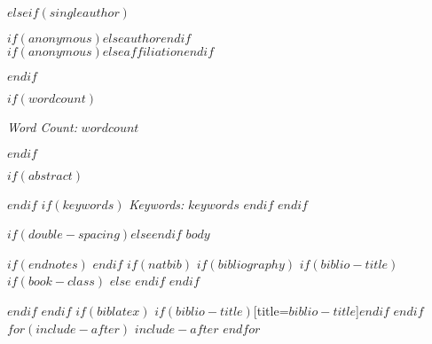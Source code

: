 \documentclass[twoside, $if(fontsize)$$fontsize$,$endif$$if(papersize)$$papersize$,$endif$$for(classoption)$$classoption$$sep$,$endfor$]{article}
\newcommand{\orcid}[1]{\href{https://orcid.org/#1}{\textcolor[HTML]{A6CE39}{\aiOrcid}}}
\newcommand{\gitrepo}[1]{\href{https://github.com/#1}{\textcolor[HTML]{000000}{\faGithub}}}
\begin{document}
	$elseif(singleauthor)$
	\begin{flushleft}
		\vspace*{6pt}
		\fontsize{26pt}{26pt}\selectfont\textit{$if(anonymous)$$else$$author$$endif$}
		\fontsize{18pt}{18pt}\selectfont\orcid{$orcid$} \gitrepo{$github$} \\
		\vspace*{12pt}                                                                                  
		\fontsize{18pt}{18pt}\selectfont \textbf{$if(anonymous)$$else$$affiliation$$endif$}
	\end{flushleft}
	$endif$
	
	$if(wordcount)$
	\begin{center}
		\textit{Word Count:} $wordcount$
	\end{center}
	$endif$
	
	$if(abstract)$
	\begin{abstract}
		\noindent\normalsize $abstract$
	\end{abstract}
	$endif$
	\vspace*{8pt}
	$if(keywords)$
	\textit{Keywords:} \textit{$keywords$}
	$endif$
	\vspace*{10pt}
	$endif$
	
	$if(double-spacing)$\doublespacing$else$\onehalfspacing$endif$
	\fontsize{$fontsize$}{$fontsize$} $body$
	
	$if(endnotes)$
	\newpage
	\theendnotes
	$endif$
	\newpage
	\singlespacing
	$if(natbib)$
	$if(bibliography)$
	$if(biblio-title)$
	$if(book-class)$
	\renewcommand\bibname{$biblio-title$}
	$else$
	\renewcommand\refname{$biblio-title$}
	$endif$
	$endif$
	
	$endif$
	$endif$
	$if(biblatex)$
	\printbibliography$if(biblio-title)$[title=$biblio-title$]$endif$
	$endif$
	$for(include-after)$
	$include-after$
	$endfor$
	
\end{document}
